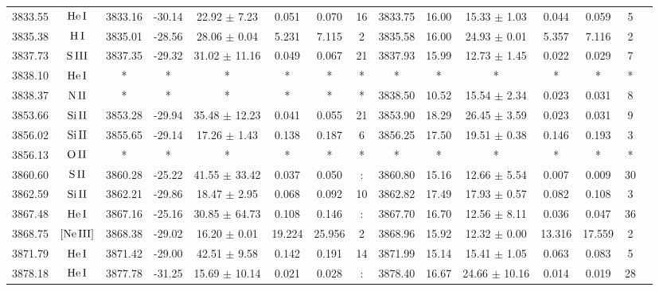 \documentclass{article}
\begin{document}
\begin{table*}
\begin{adjustbox}{width=\textwidth}
\begin{tabular}{ccccccccccccccc}
3833.55 & $\mbox{He}\thinspace \mbox{I}$ & 3833.16 & -30.14 & 22.92 $\pm$ 7.23 & 0.051 & 0.070 & 16 & 3833.75 & 16.00 & 15.33 $\pm$ 1.03 & 0.044 & 0.059 & 5 &  \\
3835.38 & $\mbox{H}\thinspace \mbox{I}$ & 3835.01 & -28.56 & 28.06 $\pm$ 0.04 & 5.231 & 7.115 & 2 & 3835.58 & 16.00 & 24.93 $\pm$ 0.01 & 5.357 & 7.116 & 2 &  \\
3837.73 & $\mbox{S}\thinspace \mbox{III}$ & 3837.35 & -29.32 & 31.02 $\pm$ 11.16 & 0.049 & 0.067 & 21 & 3837.93 & 15.99 & 12.73 $\pm$ 1.45 & 0.022 & 0.029 & 7 &  \\
3838.10 & $\mbox{He}\thinspace \mbox{I}$ & * & * & * & * & * & * & * & * & * & * & * & * &  \\
3838.37 & $\mbox{N}\thinspace \mbox{II}$ & * & * & * & * & * & * & 3838.50 & 10.52 & 15.54 $\pm$ 2.34 & 0.023 & 0.031 & 8 &  \\
3853.66 & $\mbox{Si}\thinspace \mbox{II}$ & 3853.28 & -29.94 & 35.48 $\pm$ 12.23 & 0.041 & 0.055 & 21 & 3853.90 & 18.29 & 26.45 $\pm$ 3.59 & 0.023 & 0.031 & 9 &  \\
3856.02 & $\mbox{Si}\thinspace \mbox{II}$ & 3855.65 & -29.14 & 17.26 $\pm$ 1.43 & 0.138 & 0.187 & 6 & 3856.25 & 17.50 & 19.51 $\pm$ 0.38 & 0.146 & 0.193 & 3 &  \\
3856.13 & $\mbox{O}\thinspace \mbox{II}$ & * & * & * & * & * & * & * & * & * & * & * & * &  \\
3860.60 & $\mbox{S}\thinspace \mbox{II}$ & 3860.28 & -25.22 & 41.55 $\pm$ 33.42 & 0.037 & 0.050 & : & 3860.80 & 15.16 & 12.66 $\pm$ 5.54 & 0.007 & 0.009 & 30 &  \\
3862.59 & $\mbox{Si}\thinspace \mbox{II}$ & 3862.21 & -29.86 & 18.47 $\pm$ 2.95 & 0.068 & 0.092 & 10 & 3862.82 & 17.49 & 17.93 $\pm$ 0.57 & 0.082 & 0.108 & 3 &  \\
3867.48 & $\mbox{He}\thinspace \mbox{I}$ & 3867.16 & -25.16 & 30.85 $\pm$ 64.73 & 0.108 & 0.146 & : & 3867.70 & 16.70 & 12.56 $\pm$ 8.11 & 0.036 & 0.047 & 36 &  \\
3868.75 & $\mbox{[Ne}\thinspace \mbox{III]}$ & 3868.38 & -29.02 & 16.20 $\pm$ 0.01 & 19.224 & 25.956 & 2 & 3868.96 & 15.92 & 12.32 $\pm$ 0.00 & 13.316 & 17.559 & 2 &  \\
3871.79 & $\mbox{He}\thinspace \mbox{I}$ & 3871.42 & -29.00 & 42.51 $\pm$ 9.58 & 0.142 & 0.191 & 14 & 3871.99 & 15.14 & 15.41 $\pm$ 1.05 & 0.063 & 0.083 & 5 &  \\
3878.18 & $\mbox{He}\thinspace \mbox{I}$ & 3877.78 & -31.25 & 15.69 $\pm$ 10.14 & 0.021 & 0.028 & : & 3878.40 & 16.67 & 24.66 $\pm$ 10.16 & 0.014 & 0.019 & 28 &  \\

\end{tabular}
\end{adjustbox}
\end{table*}
\end{document}
